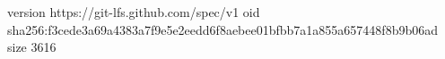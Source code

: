 version https://git-lfs.github.com/spec/v1
oid sha256:f3cede3a69a4383a7f9e5e2eedd6f8aebee01bfbb7a1a855a657448f8b9b06ad
size 3616

